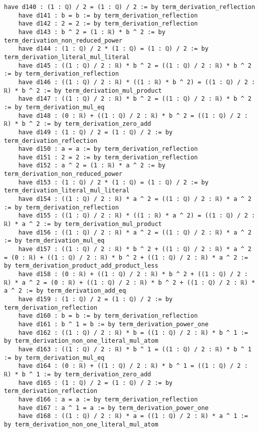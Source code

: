 \documentclass{article}
\begin{document}
\begin{tcolorbox}[colback=white!10, width=\linewidth]
\begin{lstlisting}[language=Lean4]
    have d140 : (1 : ℚ) / 2 = (1 : ℚ) / 2 := by term_derivation_reflection
    have d141 : b = b := by term_derivation_reflection
    have d142 : 2 = 2 := by term_derivation_reflection
    have d143 : b ^ 2 = (1 : ℝ) * b ^ 2 := by term_derivation_non_reduced_power
    have d144 : (1 : ℚ) / 2 * (1 : ℚ) = (1 : ℚ) / 2 := by term_derivation_literal_mul_literal
    have d145 : ((1 : ℚ) / 2 : ℝ) * b ^ 2 = ((1 : ℚ) / 2 : ℝ) * b ^ 2 := by term_derivation_reflection
    have d146 : ((1 : ℚ) / 2 : ℝ) * ((1 : ℝ) * b ^ 2) = ((1 : ℚ) / 2 : ℝ) * b ^ 2 := by term_derivation_mul_product
    have d147 : ((1 : ℚ) / 2 : ℝ) * b ^ 2 = ((1 : ℚ) / 2 : ℝ) * b ^ 2 := by term_derivation_mul_eq
    have d148 : (0 : ℝ) + ((1 : ℚ) / 2 : ℝ) * b ^ 2 = ((1 : ℚ) / 2 : ℝ) * b ^ 2 := by term_derivation_zero_add
    have d149 : (1 : ℚ) / 2 = (1 : ℚ) / 2 := by term_derivation_reflection
    have d150 : a = a := by term_derivation_reflection
    have d151 : 2 = 2 := by term_derivation_reflection
    have d152 : a ^ 2 = (1 : ℝ) * a ^ 2 := by term_derivation_non_reduced_power
    have d153 : (1 : ℚ) / 2 * (1 : ℚ) = (1 : ℚ) / 2 := by term_derivation_literal_mul_literal
    have d154 : ((1 : ℚ) / 2 : ℝ) * a ^ 2 = ((1 : ℚ) / 2 : ℝ) * a ^ 2 := by term_derivation_reflection
    have d155 : ((1 : ℚ) / 2 : ℝ) * ((1 : ℝ) * a ^ 2) = ((1 : ℚ) / 2 : ℝ) * a ^ 2 := by term_derivation_mul_product
    have d156 : ((1 : ℚ) / 2 : ℝ) * a ^ 2 = ((1 : ℚ) / 2 : ℝ) * a ^ 2 := by term_derivation_mul_eq
    have d157 : ((1 : ℚ) / 2 : ℝ) * b ^ 2 + ((1 : ℚ) / 2 : ℝ) * a ^ 2 = (0 : ℝ) + ((1 : ℚ) / 2 : ℝ) * b ^ 2 + ((1 : ℚ) / 2 : ℝ) * a ^ 2 := by term_derivation_product_add_product_less
    have d158 : (0 : ℝ) + ((1 : ℚ) / 2 : ℝ) * b ^ 2 + ((1 : ℚ) / 2 : ℝ) * a ^ 2 = (0 : ℝ) + ((1 : ℚ) / 2 : ℝ) * b ^ 2 + ((1 : ℚ) / 2 : ℝ) * a ^ 2 := by term_derivation_add_eq
    have d159 : (1 : ℚ) / 2 = (1 : ℚ) / 2 := by term_derivation_reflection
    have d160 : b = b := by term_derivation_reflection
    have d161 : b ^ 1 = b := by term_derivation_power_one
    have d162 : ((1 : ℚ) / 2 : ℝ) * b = ((1 : ℚ) / 2 : ℝ) * b ^ 1 := by term_derivation_non_one_literal_mul_atom
    have d163 : ((1 : ℚ) / 2 : ℝ) * b ^ 1 = ((1 : ℚ) / 2 : ℝ) * b ^ 1 := by term_derivation_mul_eq
    have d164 : (0 : ℝ) + ((1 : ℚ) / 2 : ℝ) * b ^ 1 = ((1 : ℚ) / 2 : ℝ) * b ^ 1 := by term_derivation_zero_add
    have d165 : (1 : ℚ) / 2 = (1 : ℚ) / 2 := by term_derivation_reflection
    have d166 : a = a := by term_derivation_reflection
    have d167 : a ^ 1 = a := by term_derivation_power_one
    have d168 : ((1 : ℚ) / 2 : ℝ) * a = ((1 : ℚ) / 2 : ℝ) * a ^ 1 := by term_derivation_non_one_literal_mul_atom

\end{lstlisting}
\end{tcolorbox}
\end{document}
